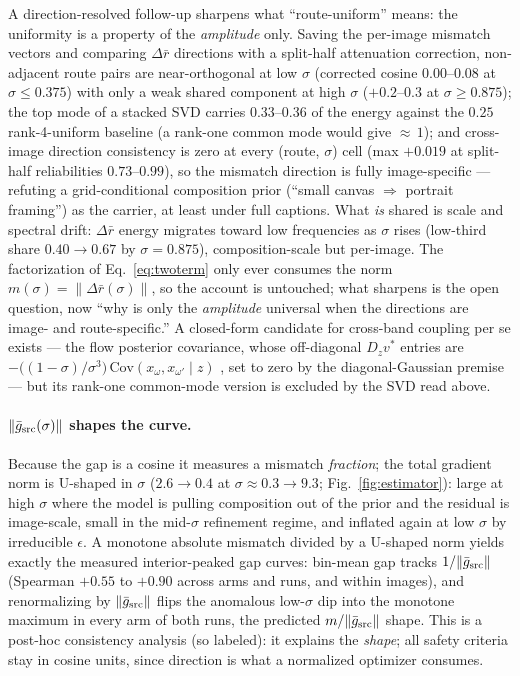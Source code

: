 A direction-resolved follow-up sharpens what ``route-uniform'' means:
the uniformity is a property of the \emph{amplitude} only. Saving the
per-image mismatch vectors and comparing $\Delta \bar r$ directions
with a split-half attenuation correction, non-adjacent route pairs are
near-orthogonal at low $\sigma$ (corrected cosine $0.00$--$0.08$ at
$\sigma \le 0.375$) with only a weak shared component at high $\sigma$
($+0.2$--$0.3$ at $\sigma \ge 0.875$); the top mode of a stacked SVD
carries $0.33$--$0.36$ of the energy against the $0.25$
rank-4-uniform baseline (a rank-one common mode would give
${\approx}\,1$); and cross-image direction consistency is zero at
every (route, $\sigma$) cell (max $+0.019$ at split-half
reliabilities $0.73$--$0.99$), so the mismatch direction is fully
image-specific --- refuting a grid-conditional composition prior
(``small canvas $\Rightarrow$ portrait framing'') as the carrier, at
least under full captions. What \emph{is} shared is scale and
spectral drift: $\Delta \bar r$ energy migrates toward low
frequencies as $\sigma$ rises (low-third share $0.40 \to 0.67$ by
$\sigma = 0.875$), composition-scale but per-image. The factorization
of Eq.~\ref{eq:twoterm} only ever consumes the norm
$m(\sigma) = \|\Delta \bar r(\sigma)\|$, so the account is untouched;
what sharpens is the open question, now ``why is only the
\emph{amplitude} universal when the directions are image- and
route-specific.'' A closed-form candidate for cross-band coupling per
se exists --- the flow posterior covariance, whose off-diagonal
$D_z v^*$ entries are
$-\big((1{-}\sigma)/\sigma^3\big)\,\mathrm{Cov}(x_\omega, x_{\omega'}
\mid z)$ \citep{xing2026divunc}, set to zero by the diagonal-Gaussian
premise ---
but its rank-one common-mode version is excluded by the SVD read
above.

\paragraph{$\|\bar g_{\mathrm{src}}(\sigma)\|$ shapes the curve.}
Because the gap is a cosine it measures a mismatch \emph{fraction}; the
total gradient norm is U-shaped in $\sigma$ ($2.6 \to 0.4$ at
$\sigma\!\approx\!0.3 \to 9.3$; Fig.~\ref{fig:estimator}): large at
high $\sigma$ where the model is pulling composition out of the prior
and the residual is image-scale, small in the mid-$\sigma$ refinement
regime, and inflated again at low $\sigma$ by irreducible $\epsilon$. A
monotone absolute mismatch divided by a U-shaped norm yields exactly the
measured interior-peaked gap curves: bin-mean gap tracks
$1/\|\bar g_{\mathrm{src}}\|$
(Spearman $+0.55$ to $+0.90$ across arms and runs, and within images),
and renormalizing by $\|\bar g_{\mathrm{src}}\|$ flips the anomalous
low-$\sigma$ dip into the monotone maximum in every arm of both runs,
the predicted $m/\|\bar g_{\mathrm{src}}\|$ shape. This is a post-hoc consistency analysis (so labeled): it
explains the \emph{shape}; all safety criteria stay in
cosine units, since direction is what a normalized optimizer consumes.

